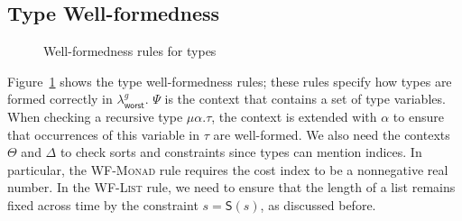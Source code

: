 \subsection{Type Well-formedness}
\begin{figure}[!htbp]
  \small
  \caption{Well-formedness rules for types}
  \label{def:worst-case-type-well-form}
\end{figure}
Figure~\ref{def:worst-case-type-well-form} shows the type well-formedness rules; these rules specify how types are formed correctly in $\lambda^g_{\mathsf{worst}}$.
$\Psi$ is the context that contains a set of type variables.  When checking a recursive type $\mu\alpha.\tau$, the context is extended with $\alpha$ to ensure that occurrences of this variable in $\tau$ are well-formed.
We also need the contexts $\Theta$ and $\Delta$ to check sorts and constraints since types can mention indices.
In particular, the \textsc{WF-Monad} rule requires the cost index to be a nonnegative real number. In the \textsc{WF-List} rule, we need to ensure that the 
length of a list remains fixed across time by the constraint $s = \mathsf{S}(s)$, as discussed before.

